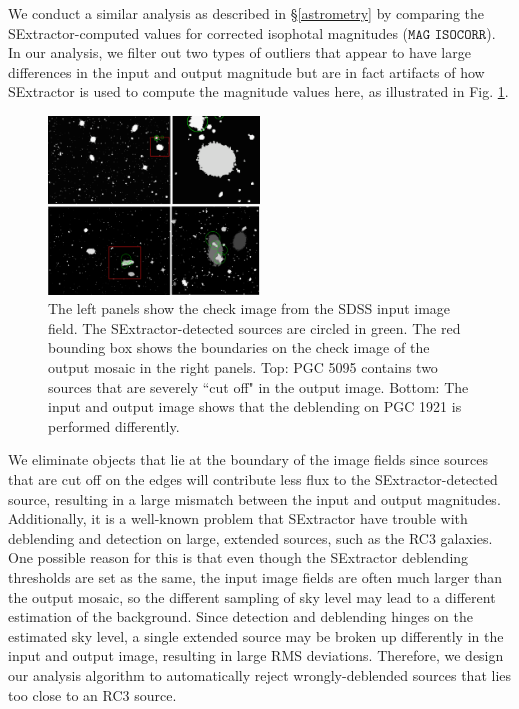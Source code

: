 \documentclass[authoryear, 12pt, 5p, times]{elsarticle}
\begin{document}
We conduct a similar analysis as described in \S\ref{astrometry} by comparing the SExtractor-computed values for corrected isophotal magnitudes ($\texttt{MAG ISOCORR}$). In our analysis, we filter out two types of outliers that appear to have large differences in the input and output magnitude but are in fact artifacts of how SExtractor is used to compute the magnitude values here, as illustrated in Fig. \ref{outlier_rejection}.
\begin{figure}[h]
\includegraphics[width=0.5\textwidth]{figures/outlier_rejection.png}
\caption{The left panels show the check image from the SDSS input image field. The SExtractor-detected sources are circled in green. The red bounding box shows the boundaries on the check image of the output mosaic in the right panels. Top: PGC 5095 contains two sources that are severely ``cut off" in the output image. Bottom:  The input and output image shows that the deblending on PGC 1921 is performed differently.}
\label{outlier_rejection}
\end{figure}
 
	We eliminate objects that lie at the boundary of the image fields since sources that are cut off on the edges will contribute less flux to the SExtractor-detected source, resulting in a large mismatch between the input and output magnitudes. Additionally, it is a well-known problem that SExtractor have trouble with deblending and detection on large, extended sources, such as the RC3 galaxies. One possible reason for this is that even though the SExtractor deblending thresholds are set as the same, the input image fields are often much larger than the output mosaic, so the different sampling of sky level may lead to a different estimation of the background. Since detection and deblending hinges on the estimated sky level, a single extended source may be broken up differently in the input and output image,  resulting in large RMS deviations. Therefore, we design our analysis algorithm to automatically reject wrongly-deblended sources that lies too close to an RC3 source. 
\end{document}
